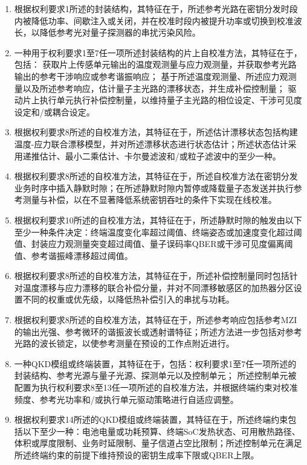 \documentclass[12pt,a4paper]{article}
\begin{document}
\begin{enumerate}[label=\arabic*.,leftmargin=2em,itemsep=0.6em]
\item
根据权利要求1所述的封装结构，其特征在于，所述参考光路在密钥分发时段内被降低功率、间歇注入或关闭，并在校准时段内被提升功率或切换到校准波长，以降低参考光对量子探测器的串扰污染风险。

\item
一种用于权利要求1至7任一项所述封装结构的片上自校准方法，其特征在于，包括：
获取片上传感单元输出的温度观测量与应力观测量，并获取参考光路输出的参考干涉响应或参考谐振响应；
基于所述温度观测量、所述应力观测量以及所述参考响应，估计量子主光路的漂移状态，并生成补偿控制量；
驱动片上执行单元执行补偿控制量，以维持量子主光路的相位设定、干涉可见度设定和/或耦合设定。

\item
根据权利要求8所述的自校准方法，其特征在于，所述估计漂移状态包括构建温度-应力联合漂移模型，并对所述漂移状态进行状态估计；所述状态估计采用递推估计、最小二乘估计、卡尔曼滤波和/或粒子滤波中的至少一种。

\item
根据权利要求8所述的自校准方法，其特征在于，所述自校准方法在密钥分发业务时序中插入静默时隙；在所述静默时隙内暂停或降载量子态发送并执行参考测量与补偿，以在不显著降低系统密钥吞吐的条件下实现在线校准。

\item
根据权利要求10所述的自校准方法，其特征在于，所述静默时隙的触发由以下至少一种条件决定：终端温度变化率超过阈值、终端姿态或加速度变化超过阈值、封装应力观测量突变超过阈值、量子误码率QBER或干涉可见度偏离阈值、参考谐振峰漂移超过阈值。

\item
根据权利要求8所述的自校准方法，其特征在于，所述补偿控制量同时包括针对温度漂移与应力漂移的联合补偿分量，并对不同漂移敏感区的加热器分区设置不同的权重或优先级，以降低热补偿引入的串扰与功耗。

\item
根据权利要求8所述的自校准方法，其特征在于，所述参考响应包括参考MZI的输出光强、参考微环的谐振波长或透射谱特征；所述方法进一步包括对参考光路的波长锁定，以使参考测量在预设的工作点附近进行。

\item
一种QKD模组或终端装置，其特征在于，包括：权利要求1至7任一项所述的封装结构、参考光源与量子光源、探测单元以及控制单元；
所述控制单元被配置为执行权利要求8至13任一项所述的自校准方法，并根据终端约束对校准频度、参考光功率和/或执行单元驱动策略进行自适应调整。

\item
根据权利要求14所述的QKD模组或终端装置，其特征在于，所述终端约束包括以下至少一种：电池电量或功耗预算、终端SoC发热状态、可用散热路径、体积或厚度限制、业务时延限制、量子信道占空比限制；所述控制单元在满足所述终端约束的前提下维持预设的密钥生成率下限或QBER上限。


\end{enumerate}
\end{document}
